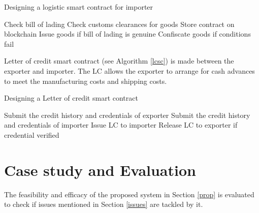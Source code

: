 \documentclass[num-refs]{wiley-article}
\begin{document}
\begin{algorithm}[!h]
\caption{Designing a logistic smart contract for importer}
\begin{algorithmic}[1]
 \State Check bill of lading
 \State Check customs clearances for goods
 \State Store contract on blockchain
 \State Issue goods if bill of lading is genuine
 \State Confiscate goods if conditions fail
\end{algorithmic}
\label{lsc}
\end{algorithm}


Letter of credit smart contract (see Algorithm \ref{lcsc}) is made between the exporter and importer. The LC allows the exporter to arrange for cash advances to meet the manufacturing costs and shipping costs.

\begin{algorithm}[!h]
\caption{Designing a Letter of credit smart contract}
\begin{algorithmic}[1]
 \State Submit the credit history and credentials of exporter
 \State Submit the credit history and credentials of importer
 \State Issue LC to importer
 \State Release LC to exporter if credential verified
\end{algorithmic}
\label{lcsc}
\end{algorithm}



\section{Case study and Evaluation} \label{res}
The feasibility and efficacy of the proposed system in Section \ref{prop} is evaluated to check if issues mentioned in Section \ref{issues} are tackled by it.
\end{document}
